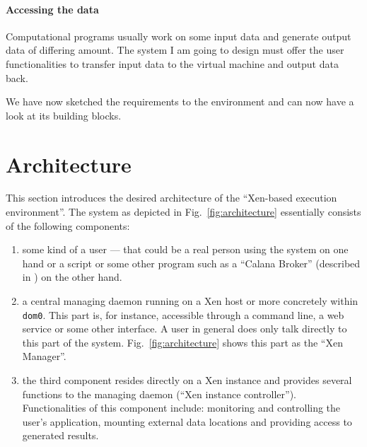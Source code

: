 \paragraph{Accessing the data}

Computational programs usually work on some input data and generate output
data of differing  amount. The system I am going to  design must offer the
user functionalities  to transfer  input data to  the virtual  machine and
output data back.

\bigskip

We have now sketched the requirements  to the environment and can now have
a look at its building blocks.

\section{Architecture}
\label{sec:architecture}

This  section  introduces  the  desired architecture  of  the  ``Xen-based
execution     environment''.      The     system    as     depicted     in
Fig.~\ref{fig:architecture}   essentially   consists   of  the   following
components:
\begin{enumerate}
  
\item some kind of a user --- that could be a real person using the system
  on  one hand  or  a script  or some  other  program such  as a  ``Calana
  Broker''        (described        in        \cite{dalheimer05agentbased,
    dalheimer06calanaprotocol}) on the other hand.
  
\item a central  managing daemon running on a Xen  \cite{xen} host or more
  concretely within \texttt{dom0}.  This part is, for instance, accessible
  through a command line, a web service or some other interface. A user in
  general  does  only   talk  directly  to  this  part   of  the  system.  
  Fig.~\ref{fig:architecture} shows this part  as the ``Xen Manager''.
  
\item the third component resides  directly on a Xen instance and provides
  several functions to the  managing daemon (``Xen instance controller''). 
  Functionalities  of this component  include: monitoring  and controlling
  the user's  application, mounting external data  locations and providing
  access to generated results.

\end{enumerate}

